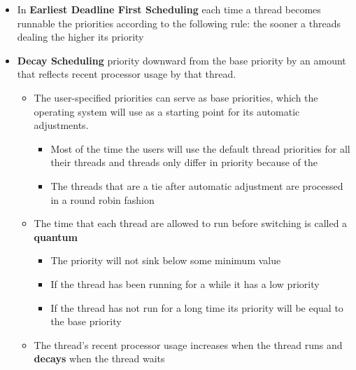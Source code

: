 \documentclass[11pt]{article}
\providecommand{\tightlist}{%
      \setlength{\itemsep}{0pt}\setlength{\parskip}{0pt}}
\begin{document}
\begin{itemize}
\tightlist
\item
  In \textbf{Earliest Deadline First Scheduling} each time a thread
  becomes runnable the priorities according to the following rule: the
  sooner a threads dealing the higher its priority
\item
  \textbf{Decay Scheduling} priority downward from the base priority by
  an amount that reflects recent processor usage by that thread.

  \begin{itemize}
  \tightlist
  \item
    The user-specified priorities can serve as base priorities, which
    the operating system will use as a starting point for its automatic
    adjustments.

    \begin{itemize}
    \tightlist
    \item
      Most of the time the users will use the default thread priorities
      for all their threads and threads only differ in priority because
      of the
    \item
      The threads that are a tie after automatic adjustment are
      processed in a round robin fashion
    \end{itemize}
  \item
    The time that each thread are allowed to run before switching is
    called a \textbf{quantum}

    \begin{itemize}
    \tightlist
    \item
      The priority will not sink below some minimum value
    \item
      If the thread has been running for a while it has a low priority
    \item
      If the thread has not run for a long time its priority will be
      equal to the base priority
    \end{itemize}
  \item
    The thread's recent processor usage increases when the thread runs
    and \textbf{decays} when the thread waits


\end{itemize}
\end{itemize}
\end{document}
